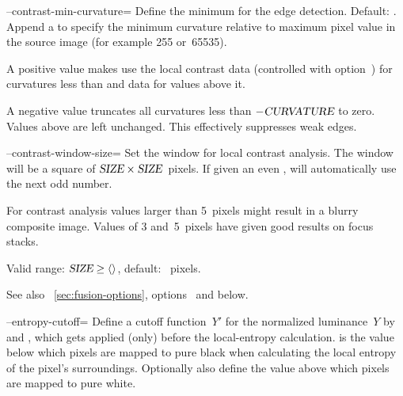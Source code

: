 \begin{codelist}
  \label{opt:contrast-min-curvature}%
\item[--contrast-min-curvature=\metavar{CURVATURE}]\itemend
  Define the minimum  for the  edge detection.  Default:
  .  Append a \sample{\%} to specify the minimum curvature
  relative to maximum pixel value in the source image (for example 255 or~65535).

  A positive value makes \App{} use the local contrast data (controlled with
  option~) for
  curvatures less than  and  data for values above it.

  A negative value truncates all curvatures less than $-\textsl{CURVATURE}$ to zero.  Values
  above  are left unchanged.  This effectively suppresses weak edges.


  \label{opt:contrast-window-size}%
\item[--contrast-window-size=\metavar{SIZE}]\itemend
  Set the window  for local contrast analysis.  The window will be a square of
  $\textsl{SIZE} \times \textsl{SIZE}$~pixels.  If given an even , \App{} will
  automatically use the next odd number.

  For contrast analysis  values larger than 5~pixels might result in a blurry
  composite image.  Values of 3 and~5~pixels have given good results on focus stacks.

  Valid range: $\metavar{SIZE} \geq \val{val:minimum-contrast-window-size}$, default:
  ~pixels.

  See also \sectionName~\ref{sec:fusion-options}, options
  ~and
   below.


  \label{opt:entropy-cutoff}%
\item[--entropy-cutoff=\metavar{LOWER-CUTOFF}\optional{:\metavar{UPPER-CUTOFF}}]\itemend
  Define a cutoff function~$Y'$ for the normalized luminance~$Y$ by  and
  , which gets applied (only) before the local-entropy calculation.
   is the value below which pixels are mapped to pure black when
  calculating the local entropy of the pixel's surroundings.  Optionally also define the
   value above which pixels are mapped to pure white.


\end{codelist}
